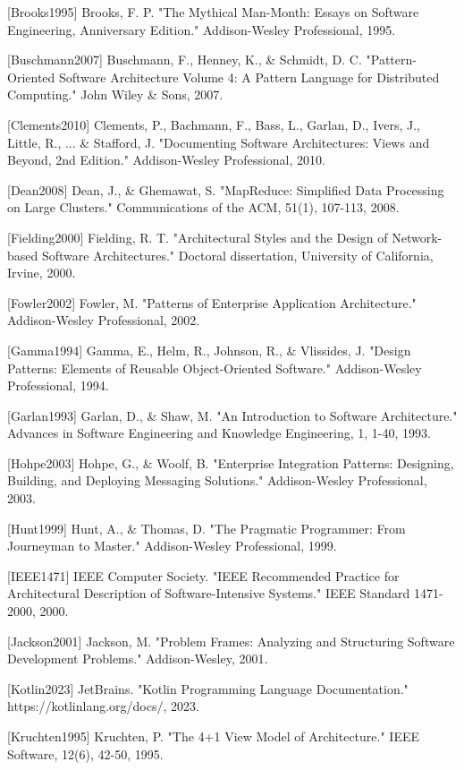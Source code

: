 \documentclass[12pt,a4paper]{article}
\begin{document}
[Brooks1995] Brooks, F. P. "The Mythical Man-Month: Essays on Software Engineering, Anniversary Edition." Addison-Wesley
Professional, 1995.

[Buschmann2007] Buschmann, F., Henney, K., \& Schmidt, D. C. "Pattern-Oriented Software Architecture Volume 4: A Pattern
Language for Distributed Computing." John Wiley \& Sons, 2007.

[Clements2010] Clements, P., Bachmann, F., Bass, L., Garlan, D., Ivers, J., Little, R., ... \& Stafford, J. "Documenting
Software Architectures: Views and Beyond, 2nd Edition." Addison-Wesley Professional, 2010.

[Dean2008] Dean, J., \& Ghemawat, S. "MapReduce: Simplified Data Processing on Large Clusters." Communications of the
ACM, 51(1), 107-113, 2008.

[Fielding2000] Fielding, R. T. "Architectural Styles and the Design of Network-based Software Architectures." Doctoral
dissertation, University of California, Irvine, 2000.

[Fowler2002] Fowler, M. "Patterns of Enterprise Application Architecture." Addison-Wesley Professional, 2002.

[Gamma1994] Gamma, E., Helm, R., Johnson, R., \& Vlissides, J. "Design Patterns: Elements of Reusable Object-Oriented
Software." Addison-Wesley Professional, 1994.

[Garlan1993] Garlan, D., \& Shaw, M. "An Introduction to Software Architecture." Advances in Software Engineering and
Knowledge Engineering, 1, 1-40, 1993.

[Hohpe2003] Hohpe, G., \& Woolf, B. "Enterprise Integration Patterns: Designing, Building, and Deploying Messaging
Solutions." Addison-Wesley Professional, 2003.

[Hunt1999] Hunt, A., \& Thomas, D. "The Pragmatic Programmer: From Journeyman to Master." Addison-Wesley Professional,
1999.

[IEEE1471] IEEE Computer Society. "IEEE Recommended Practice for Architectural Description of Software-Intensive
Systems." IEEE Standard 1471-2000, 2000.

[Jackson2001] Jackson, M. "Problem Frames: Analyzing and Structuring Software Development Problems." Addison-Wesley,
2001.

[Kotlin2023] JetBrains. "Kotlin Programming Language Documentation." https://kotlinlang.org/docs/, 2023.

[Kruchten1995] Kruchten, P. "The 4+1 View Model of Architecture." IEEE Software, 12(6), 42-50, 1995.
\end{document}
